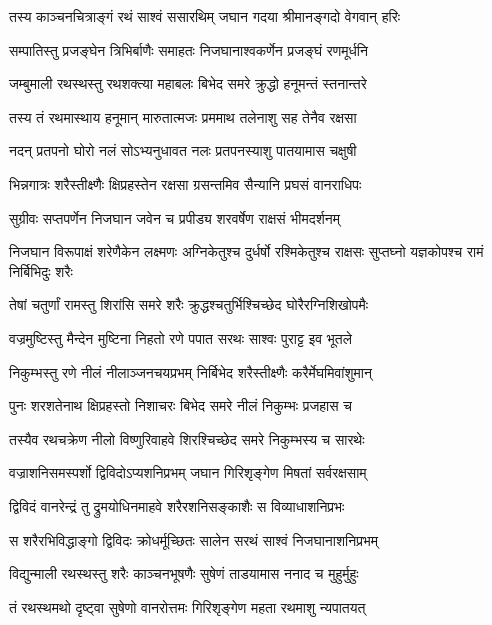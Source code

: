 \twolineshloka
{तस्य काञ्चनचित्राङ्गं रथं साश्वं ससारथिम्}
{जघान गदया श्रीमानङ्गदो वेगवान् हरिः} %

\twolineshloka
{सम्पातिस्तु प्रजङ्घेन त्रिभिर्बाणैः समाहतः}
{निजघानाश्वकर्णेन प्रजङ्घं रणमूर्धनि} %

\twolineshloka
{जम्बुमाली रथस्थस्तु रथशक्त्या महाबलः}
{बिभेद समरे क्रुद्धो हनूमन्तं स्तनान्तरे} %

\twolineshloka
{तस्य तं रथमास्थाय हनूमान् मारुतात्मजः}
{प्रममाथ तलेनाशु सह तेनैव रक्षसा} %

\twolineshloka
{नदन् प्रतपनो घोरो नलं सोऽभ्यनुधावत}
{नलः प्रतपनस्याशु पातयामास चक्षुषी} %

\twolineshloka
{भिन्नगात्रः शरैस्तीक्ष्णैः क्षिप्रहस्तेन रक्षसा}
{ग्रसन्तमिव सैन्यानि प्रघसं वानराधिपः} %

\twolineshloka
{सुग्रीवः सप्तपर्णेन निजघान जवेन च}
{प्रपीड्य शरवर्षेण राक्षसं भीमदर्शनम्} %

\threelineshloka
{निजघान विरूपाक्षं शरेणैकेन लक्ष्मणः}
{अग्निकेतुश्च दुर्धर्षो रश्मिकेतुश्च राक्षसः}
{सुप्तघ्नो यज्ञकोपश्च रामं निर्बिभिदुः शरैः} %

\twolineshloka
{तेषां चतुर्णां रामस्तु शिरांसि समरे शरैः}
{क्रुद्धश्चतुर्भिश्चिच्छेद घोरैरग्निशिखोपमैः} %

\twolineshloka
{वज्रमुष्टिस्तु मैन्देन मुष्टिना निहतो रणे}
{पपात सरथः साश्वः पुराट्ट इव भूतले} %

\twolineshloka
{निकुम्भस्तु रणे नीलं नीलाञ्जनचयप्रभम्}
{निर्बिभेद शरैस्तीक्ष्णैः करैर्मेघमिवांशुमान्} %

\twolineshloka
{पुनः शरशतेनाथ क्षिप्रहस्तो निशाचरः}
{बिभेद समरे नीलं निकुम्भः प्रजहास च} %

\twolineshloka
{तस्यैव रथचक्रेण नीलो विष्णुरिवाहवे}
{शिरश्चिच्छेद समरे निकुम्भस्य च सारथेः} %

\twolineshloka
{वज्राशनिसमस्पर्शो द्विविदोऽप्यशनिप्रभम्}
{जघान गिरिशृङ्गेण मिषतां सर्वरक्षसाम्} %

\twolineshloka
{द्विविदं वानरेन्द्रं तु द्रुमयोधिनमाहवे}
{शरैरशनिसङ्काशैः स विव्याधाशनिप्रभः} %

\twolineshloka
{स शरैरभिविद्धाङ्गो द्विविदः क्रोधर्मूच्छितः}
{सालेन सरथं साश्वं निजघानाशनिप्रभम्} %

\twolineshloka
{विद्युन्माली रथस्थस्तु शरैः काञ्चनभूषणैः}
{सुषेणं ताडयामास ननाद च मुहुर्मुहुः} %

\twolineshloka
{तं रथस्थमथो दृष्ट्वा सुषेणो वानरोत्तमः}
{गिरिशृङ्गेण महता रथमाशु न्यपातयत्} %

